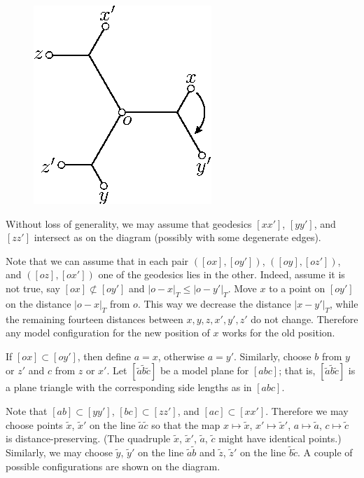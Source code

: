 \documentclass{article}
\begin{document}
\begin{figure}
\vskip-12mm
\centering
\includegraphics{mppics/pic-40}
\end{figure}

Without loss of generality, we may assume that geodesics $[xx']$, $[yy']$, and $[zz']$ intersect as on the diagram (possibly with some degenerate edges).

Note that we can assume that in each pair $([ox],[oy'])$, $([oy],[oz'])$, and $([oz],[ox'])$ one of the geodesics lies in the other.
Indeed, assume it is not true, say $[ox]\not\subset[oy']$ and $|o-x|_T\le |o-y'|_T$.
Move $x$ to a point on $[oy']$ on the distance $|o-x|_T$ from $o$.
This way we decrease the distance $|x-y'|_T$, while the remaining fourteen distances between $x,y,z,x',y',z'$ do not change.
Therefore any model configuration for the new position of $x$ works for the old position.

If $[ox]\subset [oy']$, then define $a=x$, otherwise $a=y'$.
Similarly, choose  $b$ from $y$ or $z'$ and $c$ from $z$ or $x'$.
Let $[\tilde a\tilde b\tilde c]$ be a model plane for $[abc]$;
that is, $[\tilde a\tilde b\tilde c]$ is a plane triangle with the corresponding side lengths as in $[abc]$.

Note that $[ab]\subset [yy']$, $[bc]\subset [zz']$, and $[ac]\subset [xx']$.
Therefore we may choose points $\tilde x$, $\tilde x'$ on the line $\tilde a\tilde c$ so that the map $x\mapsto \tilde x$, $x'\mapsto \tilde x'$, $a\mapsto \tilde a$, $c\mapsto \tilde c$ is distance-preserving.
(The quadruple $\tilde x$, $\tilde x'$, $\tilde a$, $\tilde c$ might have identical points.)
Similarly, we may choose $\tilde y$, $\tilde y'$ on the line $\tilde a\tilde b$ and $\tilde z$, $\tilde z'$ on the line $\tilde b\tilde c$.
A couple of possible configurations are shown on the diagram.
\end{document}
